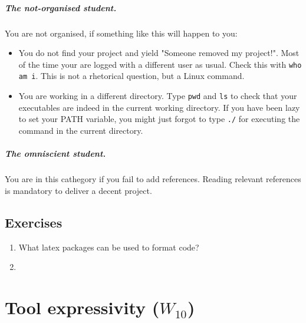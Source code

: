 \documentclass[a4paper,12pt]{report}
\begin{document}
\paragraph{The not-organised student.}
You are not organised, if something like this will happen to you:
\begin{itemize}
 \item You do not find your project and yield "Someone removed my project!". 
Most of the time your are logged with a different user as usual. 
Check this with \texttt{who am i}. 
This is not a rhetorical question, but a Linux command.
\item You are working in a different directory. 
Type \texttt{pwd} and \texttt{ls} to check that your executables are indeed in the current working directory.
If you have been lazy to set your PATH variable, you might just forgot to type \texttt{./} 
for executing the command in the current directory.
\end{itemize}

\paragraph{The omniscient student.}
You are in this cathegory if you fail to add references. 
Reading relevant references is mandatory to deliver a decent project. 

\section{Exercises}
\begin{enumerate}
 \item What latex packages can be used to format code? 
 \item 
\end{enumerate}

\vspace{0.5cm}

\vspace{0.5cm}




\chapter{Tool expressivity ($W_{10}$)}
\end{document}
